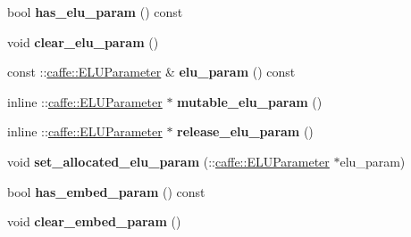 \begin{DoxyCompactItemize}
\item 
\mbox{\label{classcaffe_1_1_layer_parameter_a5f736ea10164578df3a475eace29730d}} 
bool {\bfseries has\+\_\+elu\+\_\+param} () const
\item 
\mbox{\label{classcaffe_1_1_layer_parameter_aab75f3efe9c87e8d8a958fe6122cd0a8}} 
void {\bfseries clear\+\_\+elu\+\_\+param} ()
\item 
\mbox{\label{classcaffe_1_1_layer_parameter_ae5d561d63153e90ac34a356af59311ef}} 
const \+::\mbox{\hyperlink{classcaffe_1_1_e_l_u_parameter}{caffe\+::\+E\+L\+U\+Parameter}} \& {\bfseries elu\+\_\+param} () const
\item 
\mbox{\label{classcaffe_1_1_layer_parameter_a4a49bbe5b14c7c1374ea48fdb2973e5b}} 
inline \+::\mbox{\hyperlink{classcaffe_1_1_e_l_u_parameter}{caffe\+::\+E\+L\+U\+Parameter}} $\ast$ {\bfseries mutable\+\_\+elu\+\_\+param} ()
\item 
\mbox{\label{classcaffe_1_1_layer_parameter_ae8e116e024b59f640b32b8d67c3836b9}} 
inline \+::\mbox{\hyperlink{classcaffe_1_1_e_l_u_parameter}{caffe\+::\+E\+L\+U\+Parameter}} $\ast$ {\bfseries release\+\_\+elu\+\_\+param} ()
\item 
\mbox{\label{classcaffe_1_1_layer_parameter_a210be3d805f74285d1520092f1040682}} 
void {\bfseries set\+\_\+allocated\+\_\+elu\+\_\+param} (\+::\mbox{\hyperlink{classcaffe_1_1_e_l_u_parameter}{caffe\+::\+E\+L\+U\+Parameter}} $\ast$elu\+\_\+param)
\item 
\mbox{\label{classcaffe_1_1_layer_parameter_a93af34ee70ea1145dbe4ff9365732b00}} 
bool {\bfseries has\+\_\+embed\+\_\+param} () const
\item 
\mbox{\label{classcaffe_1_1_layer_parameter_af94af310da1925c6054a1023e0516eab}} 
void {\bfseries clear\+\_\+embed\+\_\+param} ()
\item 
\mbox{\label{classcaffe_1_1_layer_parameter_a678d91e4c7b844d2cc50053a80694fb1}} 

\end{DoxyCompactItemize}
